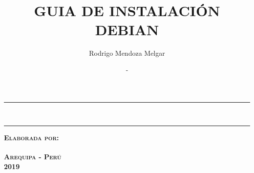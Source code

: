 \documentclass[12pt,twoside]{report}
\title{GUIA DE INSTALACIÓN DEBIAN}\let\Title\@title
\author{Rodrigo Mendoza Melgar}\let\Author\@author
\date{-}\let\Date\@date
\begin{document}
	\begin{titlepage}
		\begin{center}
			
			\vspace*{20em}
			
			\rule{\textwidth}{1.6pt}\\[0.7em]
			\textbf{\LARGE\Title}
			\vspace*{2em}
			\rule{\textwidth}{1.6pt}
			
			\vspace*{10em}
						
			\textsc{\textbf{Elaborada por:}}\\
			\textsc{\textbf{\Author}}\\[15em]
			\textsc{\textbf{Arequipa - Perú}}\\
			\textsc{\textbf{2019}}\\[1em]
		\end{center}
	\end{titlepage}
\end{document}
